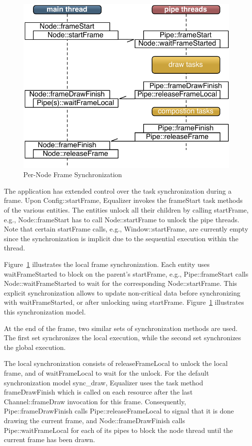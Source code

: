\documentclass[10pt,a4]{scrartcl}
\newcommand{\fig}[1]{Figure~\ref{#1}}
\begin{document}
\begin{figure}
  \includegraphics[width=.618\textwidth]{images/frameSync.pdf}
  {\caption{\label{fFrameSync}Per-Node Frame Synchronization}}
\end{figure}
The application has extended control over the task synchronization
during a frame. Upon \textsf{Config::startFrame}, Equalizer invokes the
\textsf{frameStart} task methods of the various entities. The entities
unlock all their children by calling \textsf{startFrame}, e.g.,
\textsf{Node::frameStart} has to call \textsf{Node::startFrame}
to unlock the pipe threads. Note that certain \textsf{startFrame} calls,
e.g., \textsf{Window::startFrame}, are currently empty since the
synchronization is implicit due to the sequential execution within the
thread.

\fig{fFrameSync} illustrates the local frame synchronization.
Each entity uses \textsf{waitFrame\-Started} to block on the parent's
\textsf{startFrame}, e.g., \textsf{Pipe::\-frame\-Start} calls
\textsf{Node::wait\-Frame\-Started} to wait for the corresponding
\textsf{Node::start\-Fra\-me}. This explicit synchronization allows to
update non-critical data before synchronizing with
\textsf{waitFrameStarted}, or after unlocking using
\textsf{start\-Fra\-me}. \fig{fFrameSync} illustrates this
synchronization model.

At the end of the frame, two similar sets of synchronization methods are
used. The first set synchronizes the local execution, while the second
set synchronizes the global execution.

The local synchronization consists of \textsf{releaseFrameLocal} to
unlock the local frame, and of \textsf{waitFrameLocal} to wait for the
unlock. For the default synchronization model \textsf{sync\_draw},
Equalizer uses the task method \textsf{frameDrawFinish} which is called
on each resource after the last \textsf{Channel::frameDraw} invocation
for this frame. Consequently, \textsf{Pipe::frameDraw\-Fi\-nish} calls
\textsf{Pipe::\-release\-Frame\-Lo\-cal} to signal that it is done
drawing the current frame, and \textsf{Node::frameDrawFinish} calls
\textsf{Pipe::waitFrameLocal} for each of its pipes to block the node
thread until the current frame has been drawn.
\end{document}
